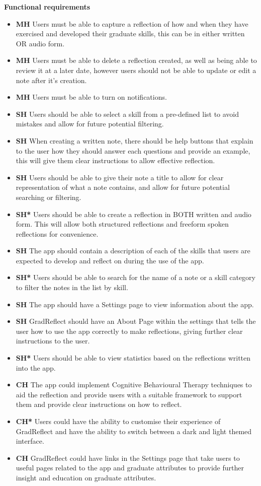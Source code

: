 \documentclass{l4proj}
\begin{document}
\textbf{Functional requirements}
\begin{itemize}
    \item \textbf{MH} Users must be able to capture a reflection of how and when they have exercised and developed their graduate skills, this can be in either written OR audio form.
    \item \textbf{MH} Users must be able to delete a reflection created, as well as being able to review it at a later date, however users should not be able to update or edit a note after it's creation. 
    \item \textbf{MH} Users must be able to turn on notifications.

    \item \textbf{SH} Users should be able to select a skill from a pre-defined list to avoid mistakes and allow for future potential filtering.
    \item \textbf{SH} When creating a written note, there should be help buttons that explain to the user how they should answer each questions and provide an example, this will give them clear instructions to allow effective reflection.
    \item \textbf{SH} Users should be able to give their note a title to allow for clear representation of what a note contains, and allow for future potential searching or filtering.
    \item \textbf{SH*} Users should be able to create a reflection in BOTH written and audio form. This will allow both structured reflections and freeform spoken reflections for convenience. 
    \item \textbf{SH} The app should contain a description of each of the skills that users are expected to develop and reflect on during the use of the app. 
    \item \textbf{SH*} Users should be able to search for the name of a note or a skill category to filter the notes in the list by skill.
    \item \textbf{SH} The app should have a Settings page to view information about the app.
    \item \textbf{SH} GradReflect should have an About Page within the settings that tells the user how to use the app correctly to make reflections, giving further clear instructions to the user. 
    \item \textbf{SH*} Users should be able to view statistics based on the reflections written into the app.
    
    \item \textbf{CH} The app could implement Cognitive Behavioural Therapy techniques to aid the reflection and provide users with a suitable framework to support them and provide clear instructions on how to reflect. 
    \item \textbf{CH*} Users could have the ability to customise their experience of GradReflect and have the ability to switch between a dark and light themed interface.
    \item \textbf{CH} GradReflect could have links in the Settings page that take users to useful pages related to the app and graduate attributes to provide further insight and education on graduate attributes.
    

\end{itemize}
\end{document}
